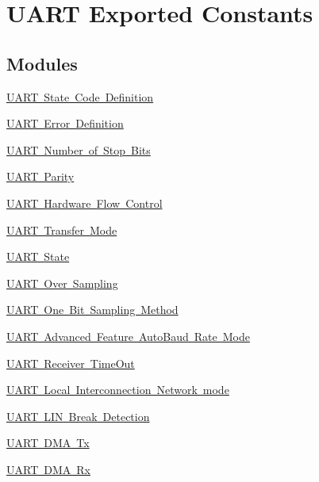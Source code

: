 \hypertarget{group___u_a_r_t___exported___constants}{}\section{U\+A\+RT Exported Constants}
\label{group___u_a_r_t___exported___constants}
\subsection*{Modules}
\begin{DoxyCompactItemize}
\item 
\mbox{\hyperlink{group___u_a_r_t___state___definition}{U\+A\+R\+T State Code Definition}}
\item 
\mbox{\hyperlink{group___u_a_r_t___error___definition}{U\+A\+R\+T Error Definition}}
\item 
\mbox{\hyperlink{group___u_a_r_t___stop___bits}{U\+A\+R\+T Number of Stop Bits}}
\item 
\mbox{\hyperlink{group___u_a_r_t___parity}{U\+A\+R\+T Parity}}
\item 
\mbox{\hyperlink{group___u_a_r_t___hardware___flow___control}{U\+A\+R\+T Hardware Flow Control}}
\item 
\mbox{\hyperlink{group___u_a_r_t___mode}{U\+A\+R\+T Transfer Mode}}
\item 
\mbox{\hyperlink{group___u_a_r_t___state}{U\+A\+R\+T State}}
\item 
\mbox{\hyperlink{group___u_a_r_t___over___sampling}{U\+A\+R\+T Over Sampling}}
\item 
\mbox{\hyperlink{group___u_a_r_t___one_bit___sampling}{U\+A\+R\+T One Bit Sampling Method}}
\item 
\mbox{\hyperlink{group___u_a_r_t___auto_baud___rate___mode}{U\+A\+R\+T Advanced Feature Auto\+Baud Rate Mode}}
\item 
\mbox{\hyperlink{group___u_a_r_t___receiver___time_out}{U\+A\+R\+T Receiver Time\+Out}}
\item 
\mbox{\hyperlink{group___u_a_r_t___l_i_n}{U\+A\+R\+T Local Interconnection Network mode}}
\item 
\mbox{\hyperlink{group___u_a_r_t___l_i_n___break___detection}{U\+A\+R\+T L\+I\+N Break Detection}}
\item 
\mbox{\hyperlink{group___u_a_r_t___d_m_a___tx}{U\+A\+R\+T D\+M\+A Tx}}
\item 
\mbox{\hyperlink{group___u_a_r_t___d_m_a___rx}{U\+A\+R\+T D\+M\+A Rx}}
\item 

\end{DoxyCompactItemize}
